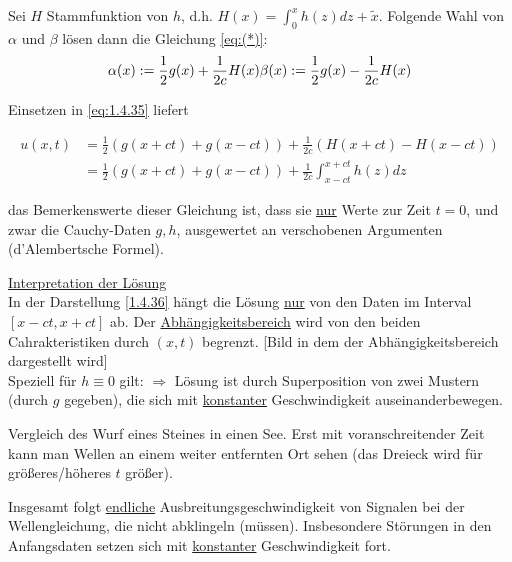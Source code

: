 Sei $H$ Stammfunktion von $h$, d.h. $H(x) = \int_{0}^{x}h(z) dz + \tilde{x}$. Folgende Wahl von $\alpha$ und $\beta$ lösen dann die Gleichung \eqref{eq:(*)}:
\[
    \alpha(x) := \frac{1}{2} g(x) + \frac{1}{2c} H(x)\\
    \beta(x) := \frac{1}{2} g(x) - \frac{1}{2c} H(x)
\]

Einsetzen in \eqref{eq:1.4.35} liefert

\begin{equation} %
    \begin{aligned}
        u(x,t) &= \frac{1}{2} \left( g(x+ct) + g(x-ct) \right) + \frac{1}{2c} \left( H(x+ct)-H(x-ct) \right)\\
        & = \frac{1}{2} \left( g(x+ct) + g(x-ct) \right) + \frac{1}{2c} \int_{x-ct}^{x+ct} h(z) dz
    \end{aligned}
\end{equation}

das Bemerkenswerte dieser Gleichung ist, dass sie \underline{nur} Werte zur Zeit $t=0$, und zwar die Cauchy-Daten $g,h$, ausgewertet an verschobenen Argumenten (d'Alembertsche Formel).

\underline{Interpretation der Lösung}\\
In der Darstellung \eqref{1.4.36} hängt die Lösung \underline{nur} von den Daten im Interval $[x-ct,x+ct]$ ab. Der \underline{Abhängigkeitsbereich} wird von den beiden Cahrakteristiken durch $(x,t)$ begrenzt.
[Bild in dem der Abhängigkeitsbereich dargestellt wird]\\

Speziell für $h\equiv 0$ gilt:
$\Rightarrow$ Lösung ist durch Superposition von zwei Mustern (durch $g$ gegeben), die sich mit \underline{konstanter} Geschwindigkeit auseinanderbewegen.

Vergleich des Wurf eines Steines in einen See. Erst mit voranschreitender Zeit kann man Wellen an einem weiter entfernten Ort sehen (das Dreieck wird für größeres/höheres $t$ größer).

Insgesamt folgt \underline{endliche} Ausbreitungsgeschwindigkeit von Signalen bei der Wellengleichung, die nicht abklingeln (müssen). Insbesondere Störungen in den Anfangsdaten setzen sich mit \underline{konstanter} Geschwindigkeit fort.
